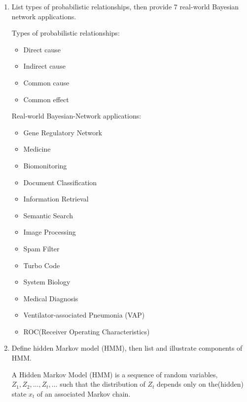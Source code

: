 \documentclass[12pt]{article}
\newenvironment{QandA}{\begin{enumerate}[label=\bfseries\arabic*.]\bfseries}
{\end{enumerate}}
\newenvironment{answered}{\par\normalfont\color{Sepia}}{}
\begin{document}
\begin{QandA}
    \item List types of probabilistic relationships, then provide 7 real-world Bayesian network applications.
    \begin{answered}
        Types of probabilistic relationships:
        \begin{itemize}
            \item Direct cause
            \item Indirect cause
            \item Common cause
            \item Common effect
        \end{itemize}

        Real-world Bayesian-Network applications:
        \begin{itemize}
            \item Gene Regulatory Network
            \item Medicine
            \item Biomonitoring
            \item Document Classification
            \item Information Retrieval
            \item Semantic Search
            \item Image Processing
            \item Spam Filter
            \item Turbo Code
            \item System Biology
            \item Medical Diagnosis
            \item Ventilator-associated Pneumonia (VAP)
            \item ROC(Receiver Operating Characteristics)
        \end{itemize}
    \end{answered}

    \item Define hidden Markov model (HMM), then list and illustrate components of HMM.
    \begin{answered}
        A Hidden Markov Model (HMM) is a sequence of random variables, $Z_1,Z_2,\ldots,Z_t,\ldots $ 
        such that the distribution of $Z_t$ depends only on the(hidden) state $x_t$ of an associated Markov chain.


\end{answered}
\end{QandA}
\end{document}
